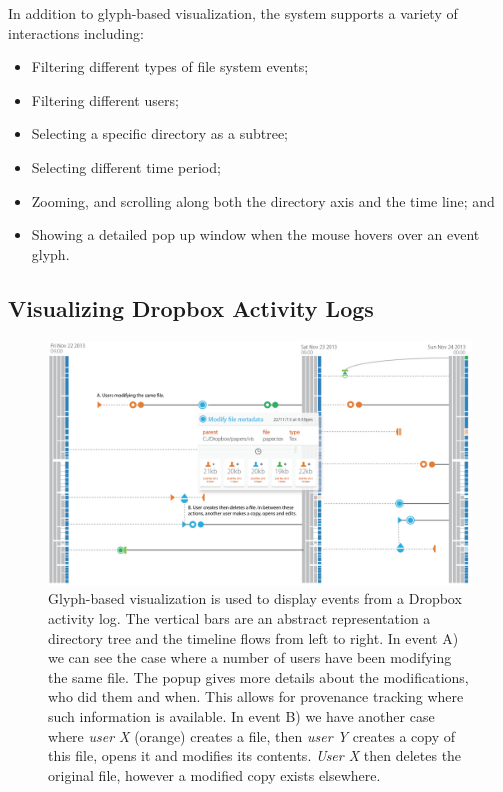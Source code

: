 In addition to glyph-based visualization, the system supports a variety of interactions including:
%
\begin{itemize}
\item Filtering different types of file system events;
\vspace{-3mm}
\item Filtering different users;
\vspace{-3mm}
\item Selecting a specific directory as a subtree;
\vspace{-3mm}
\item Selecting different time period;
\vspace{-3mm}
\item Zooming, and scrolling along both the directory axis and the time line; and
\vspace{-3mm}
\item Showing a detailed pop up window when the mouse hovers over an event glyph.
\end{itemize}

\subsection{Visualizing Dropbox Activity Logs}

\begin{figure}[ht!]
\begin{center}
\includegraphics[width=\textwidth]{images/filesystem/dropbox-casestudy-2}
\end{center}
\caption{Glyph-based visualization is used to display events from a Dropbox activity log. The vertical bars are an abstract representation a directory tree and the timeline flows from left to right.
In event A) we can see the case where a number of users have been modifying the same file. The popup gives more details about the modifications, who did them and when. This allows for provenance tracking where such information is available.
In event B) we have another case where \emph{user X} (orange) creates a file, then \emph{user Y} creates a copy of this file, opens it and modifies its contents. \emph{User X} then deletes the original file, however a modified copy exists elsewhere.}
\label{fig:dropbox}
\end{figure}

